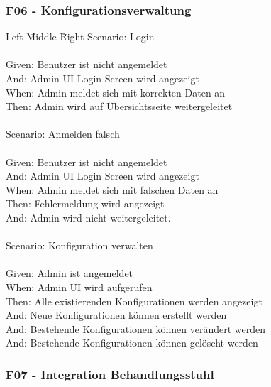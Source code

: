 \subsubsection*{F06 - Konfigurationsverwaltung}
\begin{tabbing}
    Left \= Middle \= Right \kill
    Scenario: \> \>  Login\\ \\
    Given: \> \>  Benutzer ist nicht angemeldet\\
    And: \> \>    Admin UI Login Screen wird angezeigt\\
    When: \> \>   Admin meldet sich mit korrekten Daten an\\
    Then: \> \>   Admin wird auf Übersichtsseite weitergeleitet\\ \\

    Scenario: \> \>  Anmelden falsch\\ \\
    Given: \> \>  Benutzer ist nicht angemeldet\\
    And: \> \>    Admin UI Login Screen wird angezeigt\\
    When: \> \>   Admin meldet sich mit falschen Daten an\\
    Then: \> \>   Fehlermeldung wird angezeigt\\
    And: \> \>   Admin wird nicht weitergeleitet.\\ \\

    Scenario: \> \>  Konfiguration verwalten \\ \\
    Given: \> \>  Admin ist angemeldet\\
    When: \> \>  Admin UI wird aufgerufen\\
    Then: \> \>  Alle existierenden Konfigurationen werden angezeigt\\
    And: \> \>  Neue Konfigurationen können erstellt werden\\
    And: \> \>  Bestehende Konfigurationen können verändert werden\\
    And: \> \>  Bestehende Konfigurationen können gelöscht werden\\
\end{tabbing}

\subsubsection*{F07 - Integration Behandlungsstuhl}

